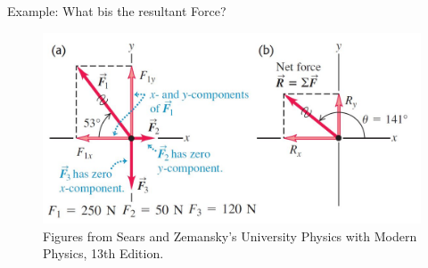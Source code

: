 \documentclass[]{beamer}
\begin{document}
 
 
 



\begin{frame}

  Example: What bis the resultant Force?
    
       
  \begin{figure}[h!]  
   \includegraphics[width=1.\textwidth]{images/f8.jpg}
   \caption{ {\tiny Figures from Sears and Zemansky's University Physics 
   with Modern Physics, 13th Edition.} }
 \end{figure}
 
 
   

       
       \end{frame}
   
 
 
 
\end{document}
